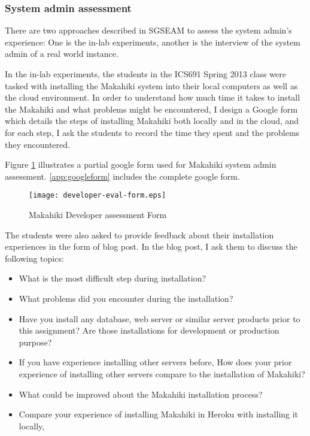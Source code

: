 \subsubsection{System admin assessment}

There are two approaches described in SGSEAM to assess the system admin's experience: One is the in-lab experiments, another is the interview of the system admin of a real world instance.

In the in-lab experiments, the students in the ICS691 Spring 2013 class were tasked with installing the Makahiki system into their local computers as well as the cloud environment. In order to understand how much time it takes to install the Makahiki and what problems might be encountered, I design a Google form which details the steps of installing Makahiki both locally and in the cloud, and for each step, I ask the students to record the time they spent and the problems they encountered.

Figure \ref{fig:developer-eval-form} illustrates a partial google form used for Makahiki system admin assessment. \autoref{app:googleform} includes the complete google form.
\begin{figure}[ht!]
   \centering
   \texttt{[image: developer-eval-form.eps]}
   \caption{Makahiki Developer assessment Form}
   \label{fig:developer-eval-form}
\end{figure}

The students were also asked to provide feedback about their installation experiences in the form of blog post. In the blog post, I ask them to discuss the following topics:
\begin{itemize}
\item What is the most difficult step during installation?
\item What problems did you encounter during the installation?
\item Have you install any database, web server or similar server products prior to this assignment? Are those installations for development or production purpose?
\item If you have experience installing other servers before, How does your prior experience of installing other servers compare to the installation of Makahiki?
\item What could be improved about the Makahiki installation process?
\item Compare your experience of installing Makahiki in Heroku with installing it locally,
\end{itemize}

